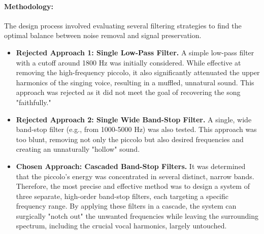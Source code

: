 \documentclass[11pt, a4paper]{article}
\begin{document}
\paragraph{Methodology:} The design process involved evaluating several filtering strategies to find the optimal balance between noise removal and signal preservation.
\begin{itemize}
    \item \textbf{Rejected Approach 1: Single Low-Pass Filter.} A simple low-pass filter with a cutoff around 1800 Hz was initially considered. While effective at removing the high-frequency piccolo, it also significantly attenuated the upper harmonics of the singing voice, resulting in a muffled, unnatural sound. This approach was rejected as it did not meet the goal of recovering the song "faithfully."

    \item \textbf{Rejected Approach 2: Single Wide Band-Stop Filter.} A single, wide band-stop filter (e.g., from 1000-5000 Hz) was also tested. This approach was too blunt, removing not only the piccolo but also desired frequencies and creating an unnaturally "hollow" sound.

    \item \textbf{Chosen Approach: Cascaded Band-Stop Filters.} It was determined that the piccolo's energy was concentrated in several distinct, narrow bands. Therefore, the most precise and effective method was to design a system of three separate, high-order band-stop filters, each targeting a specific frequency range. By applying these filters in a cascade, the system can surgically "notch out" the unwanted frequencies while leaving the surrounding spectrum, including the crucial vocal harmonics, largely untouched.
\end{itemize}
\end{document}
